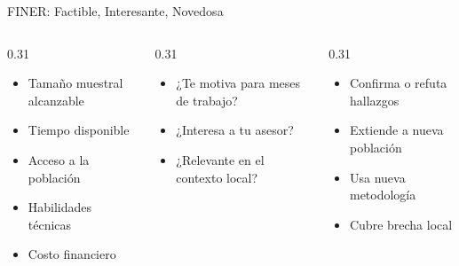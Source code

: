\documentclass[12pt, aspectratio=169]{beamer}
\begin{document}
\begin{frame}{FINER: Factible, Interesante, Novedosa}
  \begin{columns}[T]
    \begin{column}{0.31\textwidth}
      \begin{keybox}[F — Factible]
        \small
        \begin{itemize}
          \item Tamaño muestral alcanzable
          \item Tiempo disponible
          \item Acceso a la población
          \item Habilidades técnicas
          \item Costo financiero
        \end{itemize}
      \end{keybox}
    \end{column}
    \begin{column}{0.31\textwidth}
      \begin{keybox}[I — Interesante]
        \small
        \begin{itemize}
          \item ¿Te motiva para meses de trabajo?
          \item ¿Interesa a tu asesor?
          \item ¿Relevante en el contexto local?
        \end{itemize}
      \end{keybox}
    \end{column}
    \begin{column}{0.31\textwidth}
      \begin{keybox}[N — Novedosa]
        \small
        \begin{itemize}
          \item Confirma o refuta hallazgos
          \item Extiende a nueva población
          \item Usa nueva metodología
          \item Cubre brecha local
        \end{itemize}
      \end{keybox}
    \end{column}
  \end{columns}
\end{frame}
\end{document}
